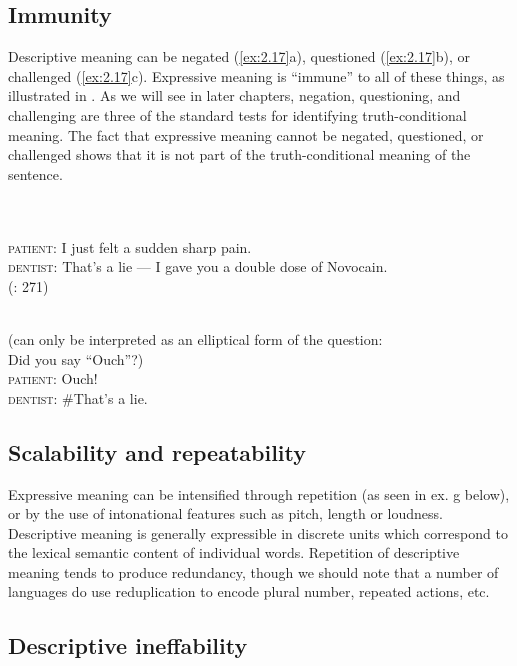 \subsection{Immunity}\label{sec:2.6.3}

Descriptive meaning can be negated (\ref{ex:2.17}a), questioned (\ref{ex:2.17}b), or challenged (\ref{ex:2.17}c). Expressive meaning is “immune” to all of these things, as illustrated in . As we will see in later chapters, negation, questioning, and challenging are three of the standard tests for identifying truth-conditional meaning. The fact that expressive meaning cannot be negated, questioned, or challenged shows that it is not part of the truth-conditional meaning of the sentence.


\ea \label{ex:2.17}
\\
\\
\ex  \textsc{patient}:  {I just felt a sudden sharp pain.}\\
  \textsc{dentist}:  {That’s a lie — I gave you a double dose of Novocain.}\\
    (\citealt{Cruse1986}: 271)
\z
                       \z

\ea \label{ex:2.18}
\\
  (can only be interpreted as an elliptical form of the question:\\
     {Did you say “Ouch”?})\\
\ex  \textsc{patient}:  {Ouch!}\\
  \textsc{dentist}: \#{That’s a lie.}
                       \z
\z

\subsection{Scalability and repeatability}\label{sec:2.6.4}

Expressive meaning can be intensified through repetition (as seen in ex. g below), or by the use of intonational features such as pitch, length or loudness. Descriptive meaning is generally expressible in discrete units which correspond to the lexical semantic content of individual words. Repetition of descriptive meaning tends to produce redundancy, though we should note that a number of languages do use reduplication to encode plural number, repeated actions, etc.


\subsection{Descriptive ineffability}\label{sec:2.6.5}

